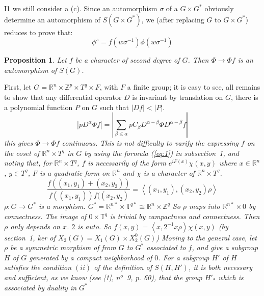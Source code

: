 \documentclass[12pt]{amsart}
\newtheorem{prop}{Proposition}
\newenvironment{expl}{\it}{\color{black}\normalsize}
\def\bR{{\mathbb{R}}}
\def\bZ{{\mathbb{Z}}}
\def\bT{{\mathbb{T}}}
\def\inn#1#2{\left\langle{#1},{#2}\right\rangle}
\def\abs#1{\left|{#1}\right|}
\newcounter{ssection}
\renewcommand{\subsection}{
  \addtocounter{ssection}{1}{\bf  \arabic{ssection}.\  }}
\begin{document}
\subsection{}
I1 we still consider a (c). Since an automorphism $\sigma$ of a $G\times G^*$ 
obviously determine an automorphism of $S(G\times G^*)$,
we (after replacing $G$ to $G\times G^*$) reduces to prove that: 
\begin{expl}
\[
\phi^s = f(w\sigma^{-1})\phi(w\sigma^{-1})
\]
\end{expl}
\begin{prop}\label{p:2}
Let $f$ be a character of second degree of $G$.
Then $\Phi\to \Phi f$ is an automorphism of $S(G)$.
\end{prop}
First, let $G=\bR^n\times \bZ^p \times T^q \times F$, 
with $F$ a finite group; it is easy to see, all remains to show that 
 any differential operator $D$ is invariant by translation on $G$,
there is a polynomial function $P$ on $G$ such that $\abs{Df}<\abs{P}$.
\begin{expl}
\[
\abs{p D^\alpha \Phi f} = \abs{\sum_{\beta\leq \alpha} p C_\beta D^{\alpha-\beta} \Phi D^{\alpha-\beta}f}
\]
this gives $\Phi \to \Phi f$ continuous.
\end{expl}
This is not difficulty to varify the  expressing $f$ on the  coset of 
$\bR^n\times T^q$ in $G$ by using the formula (\ref{eq:1}) in subsection~1,
and noting that, for $\bR^n\times T^q$, $f$ is necessarily of the form 
$e^{iF(x)}\chi(x,y)$ where $x\in \bR^n$, $y\in T^q$, 
$F$ is a quadratic form on $\bR^n$ and 
$\chi$ is a character of $\bR^n\times T^q$. 	
\begin{expl}
\[
\frac{f((x_1,y_1)+(x_2,y_2))}{f((x_1,y_1))f((x_2,y_2)} = \inn{(x_1,y_1)}{(x_2,y_2)\rho}
\]
$\rho\colon G\to G^*$ is a morphism.
$G^* = \bR^{n*}\times \bT^{q*} \cong \bR^n\times \bZ^q$ 
So $\rho$ maps into $\bR^{n*}\times 0$ by connectness. 
The image of $0\times \bT^{q}$ is trivial by campactness and connectness. 
Then $\rho$ only depends on $x$.
$2$ is auto. So $f(x,y) = \inn{x}{2^{-1}x\rho}\chi(x,y)$
(by section~1, ker of $X_2(G)=X_1(G)\times X^0_2(G)$)
\end{expl}
Moving to the general case, let $\rho$ be a symmetric morphism of from 
$G$ to $G^*$ associated to $f$, and give a subgroup $H$ of $G$ 
generated by a compact neighborhood of $0$.
For a subgroup $H'$ of $H$ satisfies the condition $(ii)$ 
of the definition of $S(H, H')$, 	
it is both necessary and sufficient,
 as we know (see [1], $n^o$~9, p. 60), that
the group $H'_*$ which is associated by duality in $G^*$ 
\end{document}
